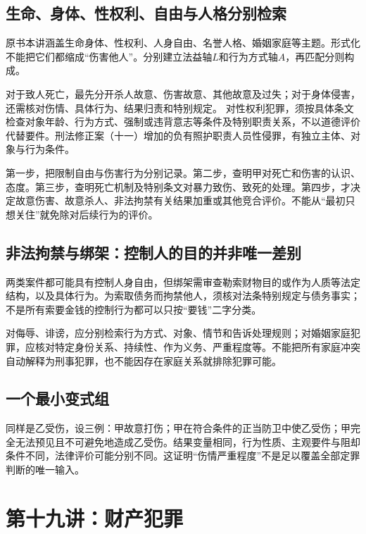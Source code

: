 \subsection{生命、身体、性权利、自由与人格分别检索}
原书本讲涵盖生命身体、性权利、人身自由、名誉人格、婚姻家庭等主题。形式化不能把它们都缩成“伤害他人”。分别建立法益轴$L$和行为方式轴$A$，再匹配分则构成。

对于致人死亡，最先分开杀人故意、伤害故意、其他故意及过失；对于身体侵害，还需核对伤情、具体行为、结果归责和特别规定。 对性权利犯罪，须按具体条文检查对象年龄、行为方式、强制或违背意志等条件及特别职责关系，不以道德评价代替要件。刑法修正案（十一）增加的负有照护职责人员性侵罪，有独立主体、对象与行为条件。

第一步，把限制自由与伤害行为分别记录。第二步，查明甲对死亡和伤害的认识、态度。第三步，查明死亡机制及特别条文对暴力致伤、致死的处理。第四步，才决定故意伤害、故意杀人、非法拘禁有关结果加重或其他竞合评价。不能从“最初只想关住”就免除对后续行为的评价。

\subsection{非法拘禁与绑架：控制人的目的并非唯一差别}
两类案件都可能具有控制人身自由，但绑架需审查勒索财物目的或作为人质等法定结构，以及具体行为。为索取债务而拘禁他人，须核对法条特别规定与债务事实；不是所有索要金钱的控制行为都可以只按“要钱”二字分类。

对侮辱、诽谤，应分别检索行为方式、对象、情节和告诉处理规则；对婚姻家庭犯罪，应核对特定身份关系、持续性、作为义务、严重程度等。不能把所有家庭冲突自动解释为刑事犯罪，也不能因存在家庭关系就排除犯罪可能。

\subsection{一个最小变式组}
同样是乙受伤，设三例：甲故意打伤；甲在符合条件的正当防卫中使乙受伤；甲完全无法预见且不可避免地造成乙受伤。结果变量相同，行为性质、主观要件与阻却条件不同，法律评价可能分别不同。这证明“伤情严重程度”不是足以覆盖全部定罪判断的唯一输入。


\section{第十九讲：财产犯罪}
